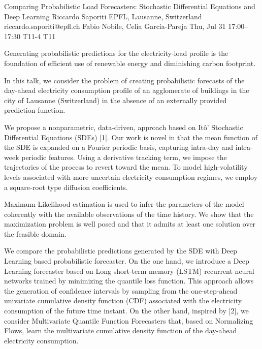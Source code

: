 \begin{talk}
  {Comparing Probabilistic Load Forecasters: Stochastic Differential Equations and Deep Learning}%
  {Riccardo Saporiti}%
  {EPFL, Lausanne, Switzerland}%
  {riccardo.saporiti@epfl.ch}%
  {Fabio Nobile, Celia Garc\'ia-Pareja}%
  {}%
  {Thu, Jul 31 17:00--17:30}%
  {T11-4}%
  {T11}%
  
    

Generating probabilistic predictions for the electricity-load profile is the foundation of efficient use of renewable energy and diminishing carbon footprint.

In this talk, we consider the problem of creating probabilistic forecasts of the day-ahead electricity consumption profile of an agglomerate of buildings in the city of Lausanne (Switzerland) in the absence of an externally provided prediction function. 
 
We propose a nonparametric, data-driven, approach based on It\^o' Stochastic Differential Equations (SDEs) [1]. Our work is novel in that the mean function of the SDE is expanded on a Fourier periodic basis, capturing intra-day and intra-week periodic features. 
Using a derivative tracking term, we impose the trajectories of the process to revert toward the mean. To model high-volatility levels associated with more uncertain electricity consumption regimes, we employ a square-root type diffusion coefficients. 

Maximum-Likelihood estimation is used to infer the parameters of the model coherently with the available observations of the time history. We show that the maximization problem is well posed and that it admits at least one solution over the feasible domain. 

We compare the probabilistic predictions generated by the SDE with Deep Learning based probabilistic forecaster. 
On the one hand, we introduce a Deep Learning forecaster based on Long short-term memory (LSTM) recurrent neural networks trained by minimizing the quantile loss function. This approach allows the generation of confidence intervals by sampling from the one-step-ahead univariate cumulative density function (CDF) associated with the electricity consumption of the future time instant. 
On the other hand, inspired by [2], we consider Multivariate Quantile Function Forecasters that, based on Normalizing Flows, learn the multivariate cumulative density function of the day-ahead electricity consumption.


\end{talk}
